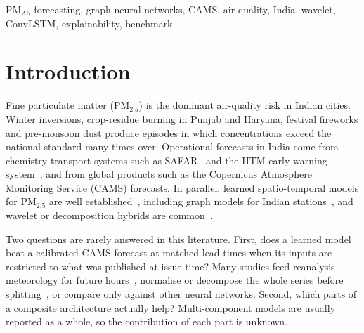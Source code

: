 \documentclass[conference]{IEEEtran}
\begin{document}
\begin{IEEEkeywords}
PM$_{2.5}$ forecasting, graph neural networks, CAMS, air quality, India, wavelet, ConvLSTM, explainability, benchmark
\end{IEEEkeywords}

\section{Introduction}
Fine particulate matter (PM$_{2.5}$) is the dominant air-quality risk in Indian cities. Winter inversions, crop-residue
burning in Punjab and Haryana, festival fireworks and pre-monsoon dust produce episodes in which concentrations exceed
the national standard many times over. Operational forecasts in India come from chemistry-transport systems such as
SAFAR~\cite{Beig_2021} and the IITM early-warning system~\cite{Ghude_2020,Jena_2021}, and from global products such as
the Copernicus Atmosphere Monitoring Service (CAMS) forecasts. In parallel, learned spatio-temporal models for PM$_{2.5}$
are well established~\cite{Wang_2020,Liang_2023,Yi_2018,Zheng_2015}, including graph models for Indian
stations~\cite{Ejurothu_2022,Mandal_2023}, and wavelet or decomposition hybrids are
common~\cite{Bai_2016,Qiao_2019,Wang_2024,He_2025}.

Two questions are rarely answered in this literature. First, does a learned model beat a calibrated CAMS forecast at
matched lead times when its inputs are restricted to what was published at issue time? Many studies feed reanalysis
meteorology for future hours~\cite{Wang_2020}, normalise or decompose the whole series before
splitting~\cite{Quilty_2018}, or compare only against other neural networks. Second, which parts of a composite
architecture actually help? Multi-component models are usually reported as a whole, so the contribution of each part is
unknown.
\end{document}
